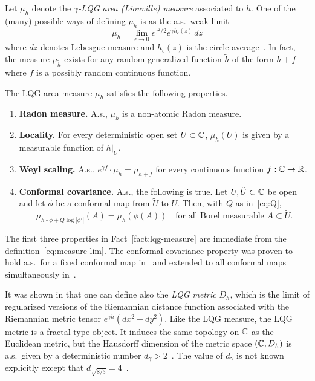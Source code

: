 \documentclass[12pt]{amsart}
\numberwithin{equation}{section}
\begin{document}
	Let $\mu_h$ denote the {\it $\gamma$-LQG area (Liouville) measure} associated to $h$. One of the (many) possible ways of defining $\mu_h$ is as the a.s.\ weak limit
	\begin{equation} \label{eq:measure-lim}
	\mu_h = \lim_{\epsilon \rightarrow 0} \epsilon^{\gamma^2/2} e^{\gamma h_\epsilon(z)} \,dz
	\end{equation}
	where $dz$ denotes Lebesgue measure and $h_\epsilon(z)$ is the circle average~\cite{duplantier2011liouville, sheffield2016field}.
	In fact, the measure $\mu_{\tilde h}$ exists for any random generalized function $\tilde h$ of the form  $h + f$ where $f$ is a possibly random continuous function. 	
	\begin{fact} \label{fact:lqg-measure}
		The LQG area measure $\mu_h$ satisfies the following properties.
		\begin{enumerate}[label=\Roman*.]
			\item {\bf Radon measure.} A.s., $\mu_h$ is a non-atomic Radon measure.
			\item {\bf Locality.} For every deterministic open set $U \subset \mathbb{C}$,
			$\mu_h(U)$ is given by a measurable function of 
			$h \vert_{U}$.
			\item {\bf Weyl scaling.} A.s., $e^{\gamma f} \cdot \mu_h = \mu_{h + f}$
			for every continuous function $f: \mathbb{C} \to \mathbb{R}$. 
			\item {\bf Conformal covariance.} A.s., the following is true. Let $U , \tilde U \subset \mathbb{C}$ be open and let $\phi$ be a conformal
			map from $\tilde U$ to $U$. Then, with $Q$ as in~\eqref{eq:Q}, 
			\begin{equation} \label{eq:measure-coord}
			\mu_{h \circ \phi + Q \log |\phi'|}(A) = \mu_h(\phi(A)) \quad \mbox{for all Borel measurable $A \subset \tilde U$}.
			\end{equation}
		\end{enumerate}
	\end{fact}
	
	The first three properties in Fact~\ref{fact:lqg-measure} are immediate from the definition~\eqref{eq:measure-lim}. The conformal covariance property was proven to hold a.s.\ for a fixed conformal map in~\cite[Proposition 2.1]{duplantier2011liouville} and extended to all conformal maps simultaneously in~\cite{sheffield2016field}.
	
	It was shown in \cite{ding2020tightness, gwynne2021existence} that one can define also the {\it LQG metric} $D_h$, 
	which is the limit of regularized versions of the Riemannian distance function associated with the Riemannian metric tensor $e^{\gamma h}(d x^2 + dy^2)$.
	Like the LQG measure, the LQG metric is a fractal-type object. It induces the same topology on $\mathbb{C}$ as the Euclidean metric, but the Hausdorff dimension of the metric space $(\mathbb{C} , D_h)$ is a.s.\ given by a deterministic number $d_\gamma > 2$~\cite[Corollary 1.7]{gp-kpz}. The value of $d_\gamma$ is not known explicitly except that $d_{\sqrt{8/3}}=4$~\cite{le2007topological}. 
	
\end{document}
